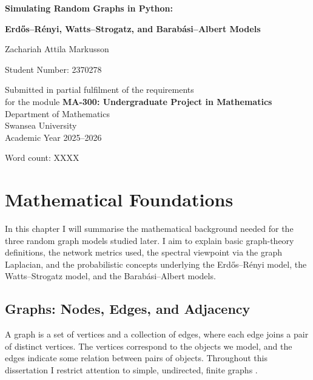 \documentclass[12pt, a4paper]{report}
\theoremstyle{definition}
\theoremstyle{plain}
\theoremstyle{remark}
\begin{document}
\begin{titlepage}
  \centering
  \vspace*{3cm}
  {\LARGE\bfseries Simulating Random Graphs in Python:\par}
  \vspace{0.4cm}
  {\large\bfseries
    Erd\H{o}s--R\'{e}nyi, Watts--Strogatz, and
    Barab\'{a}si--Albert Models\par}
  \vspace{2.5cm}
  {\large Zachariah Attila Markusson\par}
  \vspace{0.5cm}
  {\normalsize Student Number: 2370278\par}
  \vspace{2cm}
  {\normalsize
    Submitted in partial fulfilment of the requirements\\
    for the module \textbf{MA-300: Undergraduate Project in
    Mathematics}\\[0.3cm]
    Department of Mathematics\\
    Swansea University\\[0.3cm]
    Academic Year 2025--2026\par}
  \vfill
  {\small Word count: XXXX}
\end{titlepage}

\chapter{Mathematical Foundations}
\label{chap:foundations}

In this chapter I will summarise the mathematical background needed
for the three random graph models studied later. I aim to explain basic
graph-theory definitions, the network metrics used, the spectral
viewpoint via the graph Laplacian, and the probabilistic concepts
underlying the Erd\H{o}s--R\'enyi model, the Watts--Strogatz model, 
and the Barab\'asi--Albert models.

\section{Graphs: Nodes, Edges, and Adjacency}
\label{sec:graph_basics}

A graph is a set of vertices and a collection of edges,
where each edge joins a pair of distinct vertices. The vertices
correspond to the objects we model, and the edges indicate some
relation between pairs of objects. Throughout this dissertation
I restrict attention to simple, undirected, finite graphs
\cite{hofstad2017, bollobas2001}.
\end{document}
